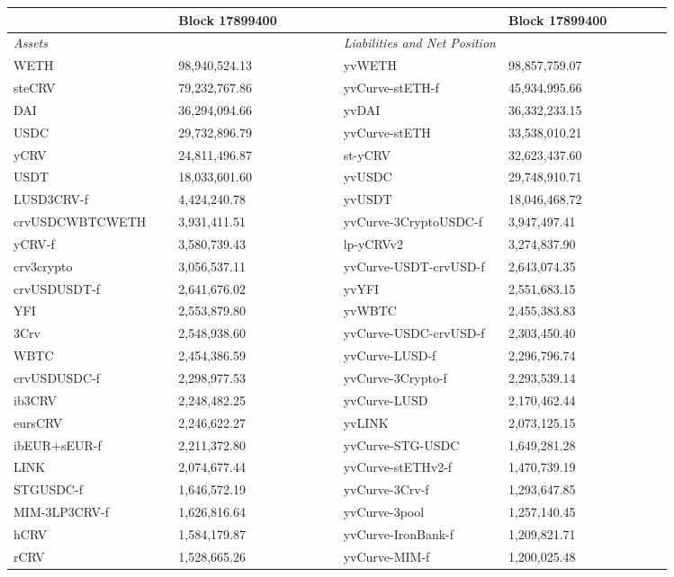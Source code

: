 
\begin{longtable}{@{}p{0.25\linewidth}p{0.25\linewidth}p{0.25\linewidth}p{0.25\linewidth}@{}}

\toprule


& Block 17899400 & & Block 17899400 \\

\midrule
\textit{Assets} & & \textit{Liabilities and Net Position} \\
WETH & 98,940,524.13 & yvWETH & 98,857,759.07 \\
steCRV & 79,232,767.86 & yvCurve-stETH-f & 45,934,995.66 \\
DAI & 36,294,094.66 & yvDAI & 36,332,233.15 \\
USDC & 29,732,896.79 & yvCurve-stETH & 33,538,010.21 \\
yCRV & 24,811,496.87 & st-yCRV & 32,623,437.60 \\
USDT & 18,033,601.60 & yvUSDC & 29,748,910.71 \\
LUSD3CRV-f & 4,424,240.78 & yvUSDT & 18,046,468.72 \\
crvUSDCWBTCWETH & 3,931,411.51 & yvCurve-3CryptoUSDC-f & 3,947,497.41 \\
yCRV-f & 3,580,739.43 & lp-yCRVv2 & 3,274,837.90 \\
crv3crypto & 3,056,537.11 & yvCurve-USDT-crvUSD-f & 2,643,074.35 \\
crvUSDUSDT-f & 2,641,676.02 & yvYFI & 2,551,683.15 \\
YFI & 2,553,879.80 & yvWBTC & 2,455,383.83 \\
3Crv & 2,548,938.60 & yvCurve-USDC-crvUSD-f & 2,303,450.40 \\
WBTC & 2,454,386.59 & yvCurve-LUSD-f & 2,296,796.74 \\
crvUSDUSDC-f & 2,298,977.53 & yvCurve-3Crypto-f & 2,293,539.14 \\
ib3CRV & 2,248,482.25 & yvCurve-LUSD & 2,170,462.44 \\
eursCRV & 2,246,622.27 & yvLINK & 2,073,125.15 \\
ibEUR+sEUR-f & 2,211,372.80 & yvCurve-STG-USDC & 1,649,281.28 \\
LINK & 2,074,677.44 & yvCurve-stETHv2-f & 1,470,739.19 \\
STGUSDC-f & 1,646,572.19 & yvCurve-3Crv-f & 1,293,647.85 \\
MIM-3LP3CRV-f & 1,626,816.64 & yvCurve-3pool & 1,257,140.45 \\
hCRV & 1,584,179.87 & yvCurve-IronBank-f & 1,209,821.71 \\
rCRV & 1,528,665.26 & yvCurve-MIM-f & 1,200,025.48 \\

\end{longtable}
